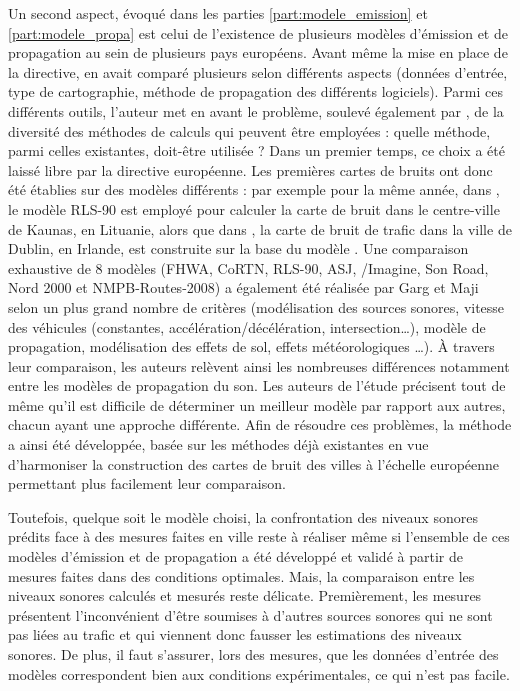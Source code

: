 Un second aspect, évoqué dans les parties \ref{part:modele_emission} et \ref{part:modele_propa} est celui de l'existence de plusieurs modèles d'émission et de propagation au sein de plusieurs pays européens. Avant même la mise en place de la directive, \cite{steele_critical_2001} en avait comparé plusieurs selon différents aspects (données d'entrée, type de cartographie, méthode de propagation des différents logiciels).
Parmi ces différents outils, l'auteur met en avant le problème, soulevé également par \cite{king_implementation_2011}, de la diversité des méthodes de calculs qui peuvent être employées : quelle méthode, parmi celles existantes, doit-être utilisée ?
Dans un premier temps, ce choix a été laissé libre par la directive européenne. Les premières cartes de bruits ont donc été établies sur des modèles différents : par exemple pour la même année, dans \cite{kliuvcininkas2006noise}, le modèle RLS-90 est employé pour calculer la carte de bruit dans le centre-ville de Kaunas, en Lituanie,  alors que dans \cite{murphy_environmental_2006}, la carte de bruit de trafic dans la ville de Dublin, en Irlande, est construite sur la base du modèle .
Une comparaison exhaustive de 8 modèles (FHWA, CoRTN, RLS-90, ASJ, /Imagine, Son Road, Nord 2000 et NMPB-Routes-2008) a également été réalisée par Garg et Maji \cite{garg_critical_2014} selon un plus grand nombre de critères (modélisation des sources sonores, vitesse des véhicules (constantes, accélération/décélération, intersection\dots), modèle de propagation, modélisation des effets de sol, effets météorologiques \dots). À travers leur comparaison, les auteurs relèvent ainsi les nombreuses différences notamment entre les modèles de propagation du son. Les auteurs de l'étude précisent tout de même qu'il est difficile de déterminer un \og meilleur \fg{} modèle par rapport aux autres, chacun ayant une approche différente.
Afin de résoudre ces problèmes, la méthode  \cite{CNOSSOS,kephalopoulos} a ainsi été développée, basée sur les méthodes déjà existantes en vue d'harmoniser la construction des cartes de bruit des villes à l'échelle européenne permettant plus facilement leur comparaison.

Toutefois, quelque soit le modèle choisi, la confrontation des niveaux sonores prédits face à des mesures faites en ville reste à réaliser même si l'ensemble de ces modèles d'émission et de propagation a été développé et validé à partir de mesures faites dans des conditions optimales. Mais, la comparaison entre les niveaux sonores calculés et mesurés reste délicate. Premièrement, les mesures présentent l'inconvénient d'être soumises à d'autres sources sonores qui ne sont pas liées au trafic et qui viennent donc fausser les estimations des niveaux sonores. De plus, il faut s'assurer, lors des mesures, que les données d'entrée des modèles correspondent bien aux conditions expérimentales, ce qui n'est pas facile.


